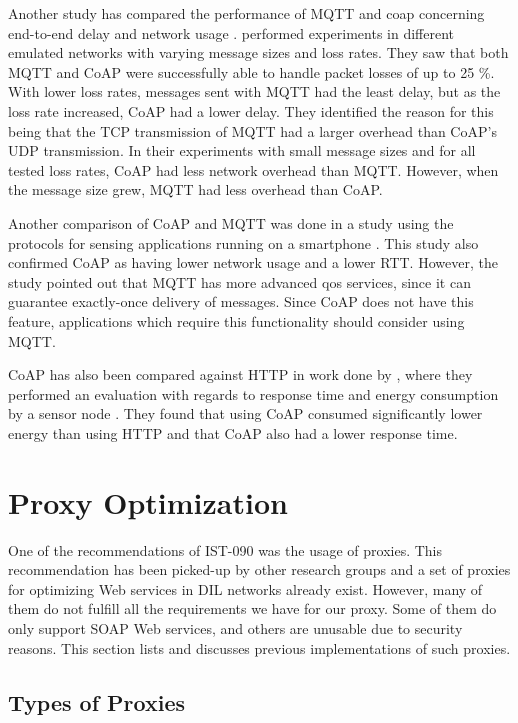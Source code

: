 Another study has compared the performance of MQTT and \gls{coap} concerning
end-to-end delay and network usage \cite{thangavel-mqtt-coap}.
 performed experiments in different emulated
networks with varying message sizes and loss rates. They saw that both MQTT and
CoAP were successfully able to handle packet losses of up to 25 \%. With lower
loss rates, messages sent with MQTT had the least delay, but as the loss rate
increased, CoAP had a lower delay. They identified the reason for this being
that the TCP transmission of MQTT had a larger overhead than CoAP's UDP
transmission. In their experiments with small message sizes and for all tested
loss rates, CoAP had less network overhead than MQTT. However, when the message
size grew, MQTT had less overhead than CoAP.

Another comparison of CoAP and MQTT was done in a study using the protocols for
sensing applications running on a smartphone \cite{caro-mqtt-coap}. This study
also confirmed CoAP as having lower network usage and a lower RTT. However, the
study pointed out that MQTT has more advanced \gls{qos} services, since it can
guarantee exactly-once delivery of messages. Since CoAP does not have this
feature, applications which require this functionality should consider using
MQTT.

CoAP has also been compared against HTTP in work done by
\citeauthor{walter-coap-http}, where they performed an evaluation with regards
to response time and energy consumption by a sensor node
\cite{walter-coap-http}. They found that using CoAP consumed significantly lower
energy than using HTTP and that CoAP also had  a lower response time.

\section{Proxy Optimization}

One of the recommendations of IST-090 was the usage of proxies. This
recommendation has been picked-up by other research groups and a set of proxies
for optimizing Web services in DIL networks already exist. However, many of them
do not fulfill all the requirements we have for our proxy. Some of them do only
support SOAP Web services, and others are unusable due to security reasons. This
section lists and discusses previous implementations of such proxies.

\subsection{Types of Proxies}

